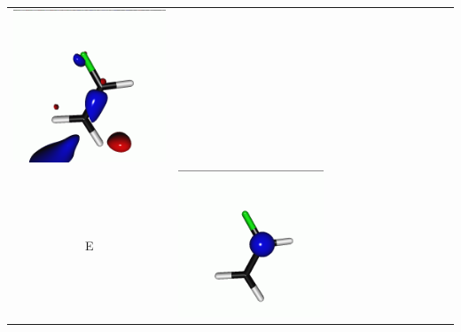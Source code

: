 \documentclass[journal=jctcce,manuscript=article]{achemso}
\begin{document}
\begin{table}[H]
\begin{tabular}{c|ccc|cccc|cccc}
\begin{minipage}{0.2\textwidth}
         \includegraphics[scale=0.10]{NTO/CH2CHF/8p_019.png}
     \end{minipage}
     \\
                  E &  
     \begin{minipage}{0.2\textwidth}
         \centering
         \includegraphics[scale=0.10]{NTO/CH2CHF/11h.png}

\end{minipage}
\end{tabular}
\end{table}
\end{document}
